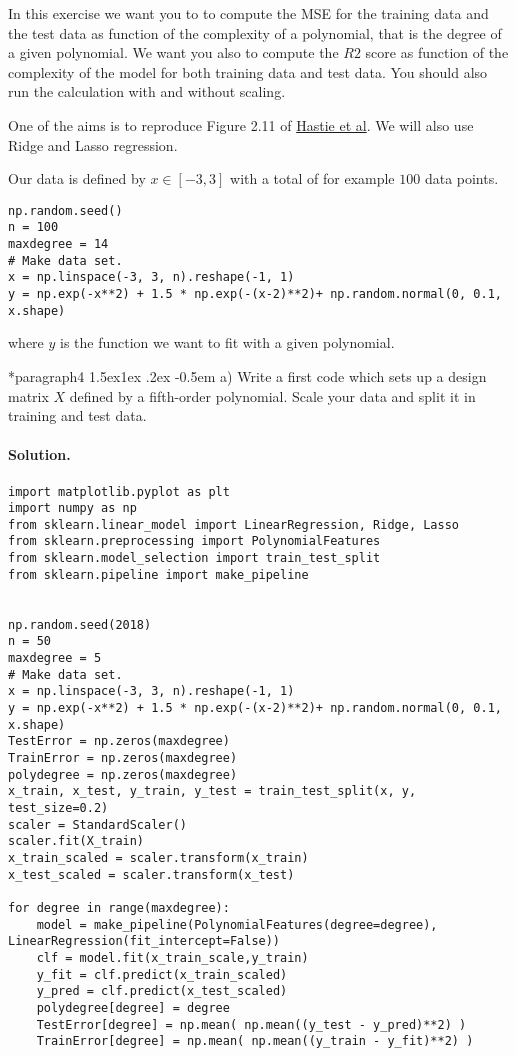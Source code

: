 \documentclass[%
oneside,                 %
final,                   %
10pt]{article}
\makeatletter
\newenvironment{doconceexercise}{}{}
\newcommand\subex{\@startsection*{paragraph}{4}{\z@}%
                  {1.5ex\@plus1ex \@minus.2ex}%
                  {-0.5em}%
                  {\normalfont\normalsize\bfseries}}
\makeatother
\begin{document}
\begin{doconceexercise}
In this exercise we want you to to compute the MSE for the training
data and the test data as function of the complexity of a polynomial,
that is the degree of a given polynomial. We want you also to compute the $R2$ score as function of the complexity of the model for both training data and test data.  You should also run the calculation with and without scaling. 

One of 
the aims is to reproduce Figure 2.11 of \href{{https://github.com/CompPhysics/MLErasmus/blob/master/doc/Textbooks/elementsstat.pdf}}{Hastie et al}.
We will also use Ridge and Lasso regression. 


Our data is defined by $x\in [-3,3]$ with a total of for example $100$ data points.
\begin{verbatim}
np.random.seed()
n = 100
maxdegree = 14
# Make data set.
x = np.linspace(-3, 3, n).reshape(-1, 1)
y = np.exp(-x**2) + 1.5 * np.exp(-(x-2)**2)+ np.random.normal(0, 0.1, x.shape)
\end{verbatim}
where $y$ is the function we want to fit with a given polynomial.


\subex{a)}
Write a first code which sets up a design matrix $X$ defined by a fifth-order polynomial.  Scale your data and split it in training and test data.


\paragraph{Solution.}
\begin{verbatim}
import matplotlib.pyplot as plt
import numpy as np
from sklearn.linear_model import LinearRegression, Ridge, Lasso
from sklearn.preprocessing import PolynomialFeatures
from sklearn.model_selection import train_test_split
from sklearn.pipeline import make_pipeline


np.random.seed(2018)
n = 50
maxdegree = 5
# Make data set.
x = np.linspace(-3, 3, n).reshape(-1, 1)
y = np.exp(-x**2) + 1.5 * np.exp(-(x-2)**2)+ np.random.normal(0, 0.1, x.shape)
TestError = np.zeros(maxdegree)
TrainError = np.zeros(maxdegree)
polydegree = np.zeros(maxdegree)
x_train, x_test, y_train, y_test = train_test_split(x, y, test_size=0.2)
scaler = StandardScaler()
scaler.fit(X_train)
x_train_scaled = scaler.transform(x_train)
x_test_scaled = scaler.transform(x_test)

for degree in range(maxdegree):
    model = make_pipeline(PolynomialFeatures(degree=degree), LinearRegression(fit_intercept=False))
    clf = model.fit(x_train_scale,y_train)
    y_fit = clf.predict(x_train_scaled)
    y_pred = clf.predict(x_test_scaled) 
    polydegree[degree] = degree
    TestError[degree] = np.mean( np.mean((y_test - y_pred)**2) )
    TrainError[degree] = np.mean( np.mean((y_train - y_fit)**2) )


\end{verbatim}
\end{doconceexercise}
\end{document}
